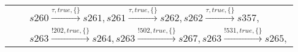 \begin{tabular}{lcp{350px}}
& & $\mathit{s260}\xrightarrow{\mathit{\tau}, \mathit{true}, \{\}}\mathit{s261},\mathit{s261}\xrightarrow{\mathit{\tau}, \mathit{true}, \{\}}\mathit{s262},\mathit{s262}\xrightarrow{\mathit{\tau}, \mathit{true}, \{\}}\mathit{s357},$ \\
& & $\mathit{s263}\xrightarrow{\mathit{!202}, \mathit{true}, \{\}}\mathit{s264},\mathit{s263}\xrightarrow{\mathit{!502}, \mathit{true}, \{\}}\mathit{s267},\mathit{s263}\xrightarrow{\mathit{!531}, \mathit{true}, \{\}}\mathit{s265},$ \\
\end{tabular}

\begin{tabular}{lcp{350px}}
\end{tabular}

\begin{tabular}{lcp{350px}}
\end{tabular}

